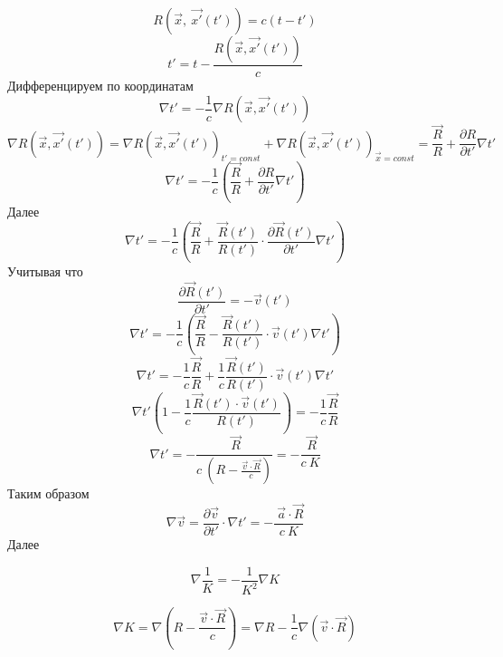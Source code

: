 \documentclass[11pt]{article}
\begin{document}
\[R\left( \overrightarrow{x},\ \overrightarrow{x'}\left( t' \right) \right)=c\left( t-t' \right)\]
\[t'=t-\frac{R\left( \overrightarrow{x},\overrightarrow{x'}\left( t' \right) \right)}{c}\]
Дифференцируем по координатам
\[\nabla t'=-\frac{1}{c}\nabla R\left( \overrightarrow{x},\overrightarrow{x'}\left( t' \right) \right)\]
\[\nabla R\left( \overrightarrow{x},\overrightarrow{x'}\left( t' \right) \right)=\nabla R{{\left( \overrightarrow{x},\overrightarrow{x'}\left( t' \right) \right)}_{t'=const}}+\nabla R{{\left( \overrightarrow{x},\overrightarrow{x'}\left( t' \right) \right)}_{\overrightarrow{x}=const}}=\frac{\overrightarrow{R}}{R}+\frac{\partial R}{\partial t'}\nabla t'\]
\[\nabla t'=-\frac{1}{c}\left( \frac{\overrightarrow{R}}{R}+\frac{\partial R}{\partial t'}\nabla t' \right)\]
Далее
\[\nabla t'=-\frac{1}{c}\left( \frac{\overrightarrow{R}}{R}+\frac{\overrightarrow{R}\left( t' \right)}{R\left( t' \right)}\cdot \frac{\partial \overrightarrow{R}\left( t' \right)}{\partial t'}\nabla t' \right)\]
Учитывая что
\[\frac{\partial \overrightarrow{R}\left( t' \right)}{\partial t'}=-\overrightarrow{v}\left( t' \right)\]
\[\nabla t'=-\frac{1}{c}\left( \frac{\overrightarrow{R}}{R}-\frac{\overrightarrow{R}\left( t' \right)}{R\left( t' \right)}\cdot \overrightarrow{v}\left( t' \right)\nabla t' \right)\]
\[\nabla t'=-\frac{1}{c}\frac{\overrightarrow{R}}{R}+\frac{1}{c}\frac{\overrightarrow{R}\left( t' \right)}{R\left( t' \right)}\cdot \overrightarrow{v}\left( t' \right)\nabla t'\]
\[\nabla t'\left( 1-\frac{1}{c}\frac{\overrightarrow{R}\left( t' \right)\cdot \overrightarrow{v}\left( t' \right)}{R\left( t' \right)} \right)=-\frac{1}{c}\frac{\overrightarrow{R}}{R}\]
\[\nabla t'=-\frac{\ \overrightarrow{R}}{c\ \left( R-\frac{\overrightarrow{v}\cdot \overrightarrow{R}}{c} \right)}=-\frac{\ \overrightarrow{R}}{c\ K}\]
Таким образом
\[\nabla \overrightarrow{v}=\frac{\partial \overrightarrow{v}}{\partial t'}\cdot \nabla t'=-\frac{\ \overrightarrow{a}\cdot \overrightarrow{R}}{c\ K}\]
Далее

\[\nabla \frac{1}{K}=-\frac{1}{{{K}^{2}}}\nabla K\]

\[\nabla K=\nabla \left( R-\frac{\overrightarrow{v}\cdot \overrightarrow{R}}{c} \right)=\nabla R-\frac{1}{c}\nabla \left( \overrightarrow{v}\cdot \overrightarrow{R} \right)\]
\end{document}
